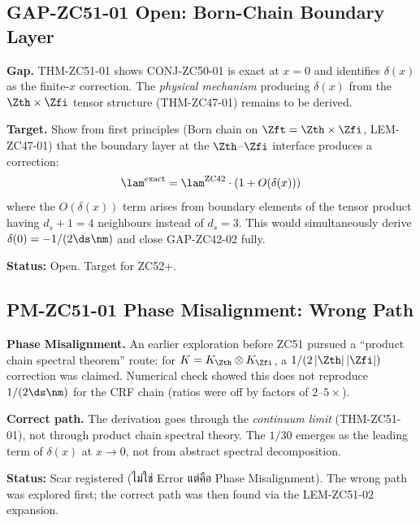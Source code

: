\documentclass[12pt, a4paper]{article}
\begin{document}
\subsection{GAP-ZC51-01 \quad Open: Born-Chain Boundary Layer}


\begin{openqbox}[title={GAP-ZC51-01: Derive $\delta(x)$ from
  $\mathbb{Z}_3\times\mathbb{Z}_5$ Boundary Structure}]
\textbf{Gap.}
THM-ZC51-01 shows CONJ-ZC50-01 is exact at $x=0$ and identifies
$\delta(x)$ as the finite-$x$ correction. The \emph{physical
mechanism} producing $\delta(x)$ from the $\Zth\times\Zfi$
tensor structure (THM-ZC47-01) remains to be derived.

\textbf{Target.}
Show from first principles (Born chain on $\Zft = \Zth\times\Zfi$,
LEM-ZC47-01) that the boundary layer at the $\Zth$--$\Zfi$
interface produces a correction:
\[
  \lam^{\rm exact} = \lam^{\rm ZC42}\cdot\left(1 + O(\delta(x))\right)
\]
where the $O(\delta(x))$ term arises from boundary elements of the
tensor product having $d_s+1=4$ neighbours instead of $d_s=3$.
This would simultaneously derive $\delta(0) = -1/(2\ds\nm)$
and close GAP-ZC42-02 fully.

\textbf{Status:} Open. Target for ZC52+.
\end{openqbox}

\subsection{PM-ZC51-01 \quad Phase Misalignment: Wrong Path}

\begin{openqbox}[title={PM-ZC51-01: Probe Pursued Wrong Path
  (Product Chain Spectral Theorem)}]
\textbf{Phase Misalignment.}
An earlier exploration before ZC51 pursued a ``product chain spectral
theorem'' route: for $K = K_{\Zth}\otimes K_{\Zfi}$, a
$1/(2\,|\Zth|\,|\Zfi|)$ correction was claimed. Numerical check
showed this does not reproduce $1/(2\ds\nm)$ for the CRF chain
(ratios were off by factors of $2$--$5\times$).

\textbf{Correct path.} The derivation goes through the
\emph{continuum limit} (THM-ZC51-01), not through product chain
spectral theory. The $1/30$ emerges as the leading term of
$\delta(x)$ at $x\to 0$, not from abstract spectral decomposition.

\textbf{Status:} Scar registered (ไม่ใช่ Error แต่คือ Phase
Misalignment). The wrong path was explored first; the correct
path was then found via the LEM-ZC51-02 expansion.
\end{openqbox}
\end{document}
